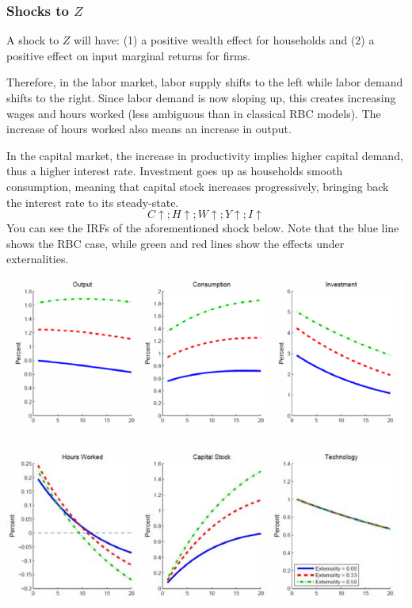 \documentclass[12pt]{report}
\begin{document}
\subsubsection{Shocks to $Z$}

A shock to $Z$ will have: (1) a positive wealth effect for households and (2) a positive effect on input marginal returns for firms.

Therefore, in the labor market, labor supply shifts to the left while labor demand shifts to the right. Since labor demand is now sloping up, this creates increasing wages and hours worked (less ambiguous than in classical RBC models). The increase of hours worked also means an increase in output. 

In the capital market, the increase in productivity implies higher capital demand, thus a higher interest rate. Investment goes up as households smooth consumption, meaning that capital stock increases progressively, bringing back the interest rate to its steady-state.$$ C\uparrow ; H\uparrow ; W\uparrow ; Y \uparrow ; I\uparrow $$ You can see the IRFs of the aforementioned shock below. Note that the blue line shows the RBC case, while green and red lines show the effects under externalities. \begin{center}
\includegraphics[scale=0.4]{images/RBC3-zshock1.PNG} 

\end{center}
\end{document}
